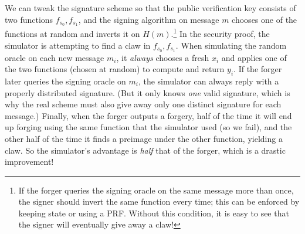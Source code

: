 \documentclass[11pt]{article}
\begin{document}
We can tweak the signature scheme so that the public verification key
consists of two functions $f_{s_{0}}, f_{s_{1}}$, and the signing
algorithm on message $m$ chooses one of the functions at random and
inverts it on $H(m)$.\footnote{If the forger queries the signing
  oracle on the same message more than once, the signer should invert
  the same function every time; this can be enforced by keeping state
  or using a PRF.  Without this condition, it is easy to see that the
  signer will eventually give away a claw!}  In the security proof,
the simulator is attempting to find a claw in $f_{s_{0}}, f_{s_{1}}$.
When simulating the random oracle on each new message $m_{i}$, it
\emph{always} chooses a fresh $x_{i}$ and applies one of the two
functions (chosen at random) to compute and return $y_{i}$.  If the
forger later queries the signing oracle on $m_{i}$, the simulator can
always reply with a properly distributed signature.  (But it only
knows \emph{one} valid signature, which is why the real scheme must
also give away only one distinct signature for each message.)
Finally, when the forger outputs a forgery, half of the time it will
end up forging using the same function that the simulator used (so we
fail), and the other half of the time it finds a preimage under the
other function, yielding a claw.  So the simulator's advantage is
\emph{half} that of the forger, which is a drastic improvement!
\end{document}
